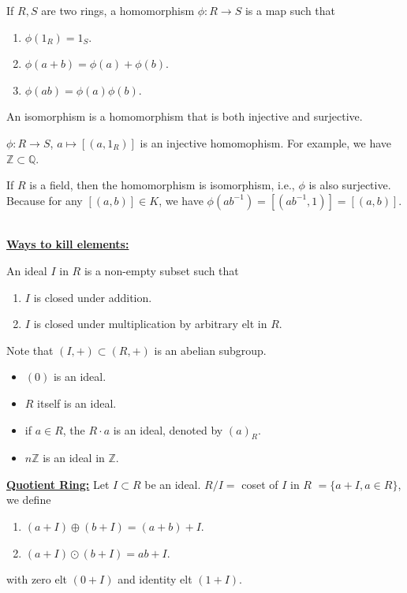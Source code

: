 \begin{definition}
If $R,S$ are two rings, a homomorphism $\phi:R\rightarrow S$ is a map such that \begin{enumerate}
\item $\phi(1_R)=1_S$.
\item $\phi(a+b) = \phi(a)+\phi(b)$.
\item $\phi(ab) = \phi(a)\phi(b)$.
\end{enumerate}
An isomorphism is a homomorphism that is both injective and surjective.
\end{definition}
$\phi: R\rightarrow S$, $a\mapsto [(a,1_R)]$ is an injective homomophism. For example, we have $\mathbb{Z}\subset \mathbb{Q}$.
\begin{remark}
If $R$ is a field, then the homomorphism is isomorphism, i.e., $\phi$ is also surjective. Because for any $[(a,b)]\in K$, we have $\phi(ab^{-1})=[(ab^{-1},1)] = [(a,b)]$.
\end{remark}\mbox{}\\
\underline{\bfseries Ways to kill elements:}
\begin{definition}
An ideal $I$ in $R$ is a non-empty subset such that 
\begin{enumerate}
\item $I$ is closed under addition.
\item $I$ is closed under multiplication by arbitrary elt in $R$.
\end{enumerate}
Note that $(I, +)\subset (R,+)$ is an abelian subgroup.
\end{definition}
\begin{example}\mbox{}
\begin{itemize}
\item $(0)$ is an ideal.
\item $R$ itself is an ideal.
\item if $a\in R$, the $R\cdot a$ is an ideal, denoted by $(a)_R$.
\item $n\mathbb{Z}$ is an ideal in $\mathbb{Z}$.
\end{itemize}
\end{example}
\underline{\bfseries Quotient Ring:} Let $I\subset R$ be an ideal. $R/I=$ coset of $I$ in $R$ $=\{a+I,a\in R\}$, we define
\begin{enumerate}
\item $(a+I)\oplus(b+I) = (a+b)+I$.
\item $(a+I)\odot(b+I)=ab+I$.
\end{enumerate}
with zero elt $(0+I)$ and identity elt $(1+I)$.
